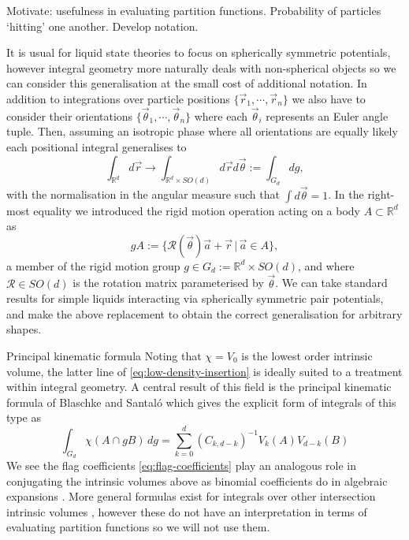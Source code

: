 Motivate: usefulness in evaluating partition functions.
Probability of particles `hitting' one another.
Develop notation.

It is usual for liquid state theories to focus on spherically symmetric potentials, however integral geometry more naturally deals with non-spherical objects so we can consider this generalisation at the small cost of additional notation.
In addition to integrations over particle positions $\{\vec{r}_1, \cdots, \vec{r}_n\}$ we also have to consider their orientations $\{\vec{\theta}_1, \cdots, \vec{\theta}_n\}$ where each $\vec{\theta}_i$ represents an Euler angle tuple.
Then, assuming an isotropic phase where all orientations are equally likely each positional integral generalises to
\begin{equation*}
  \int_{\mathbb{R}^d} d\vec{r}
  \to
  \int_{\mathbb{R}^d \times SO(d)} d\vec{r} d\vec{\theta}
  :=
  \int_{G_d} dg,
\end{equation*}
with the normalisation in the angular measure such that $\int d\vec{\theta} = 1$. In the right-most equality we introduced the rigid motion operation acting on a body $A \subset \mathbb{R}^d$ as
\begin{equation*}
  g A := \{\mathcal{R}(\vec{\theta}) \vec{a} + \vec{r} \, | \, \vec{a} \in A\},
\end{equation*}
a member of the rigid motion group $g \in G_d := \mathbb{R}^d \times SO(d)$, and where $\mathcal{R} \in SO(d)$ is the rotation matrix parameterised by $\vec{\theta}$.
We can take standard results for simple liquids interacting via spherically symmetric pair potentials, and make the above replacement to obtain the correct generalisation for arbitrary shapes.

\begin{theorem}{Principal kinematic formula}
  Noting that $\chi = V_0$ is the lowest order intrinsic volume, the latter line of \eqref{eq:low-density-insertion} is ideally suited to a treatment within integral geometry.
  A central result of this field is the principal kinematic formula of Blaschke and Santal\'o \cite{BlaschkeMZ1936,Blaschke1937,SantaloASI1936} which gives the explicit form of integrals of this type as \cite{Santalo2004,Klain1997}
  \begin{equation}\label{eq:binomial-kinematic-equation}
    \int_{G_d} \chi(A \cap gB) \, dg
    =
    \sum_{k=0}^d (C_{k,d-k})^{-1} V_k(A) V_{d-k}(B)
  \end{equation}
  We see the flag coefficients \eqref{eq:flag-coefficients} play an analogous role in conjugating the intrinsic volumes above as binomial coefficients do in algebraic expansions%
  .
  More general formulas exist for integrals over other intersection intrinsic volumes \cite{Klain1997}, however these do not have an interpretation in terms of evaluating partition functions so we will not use them.
\end{theorem}

